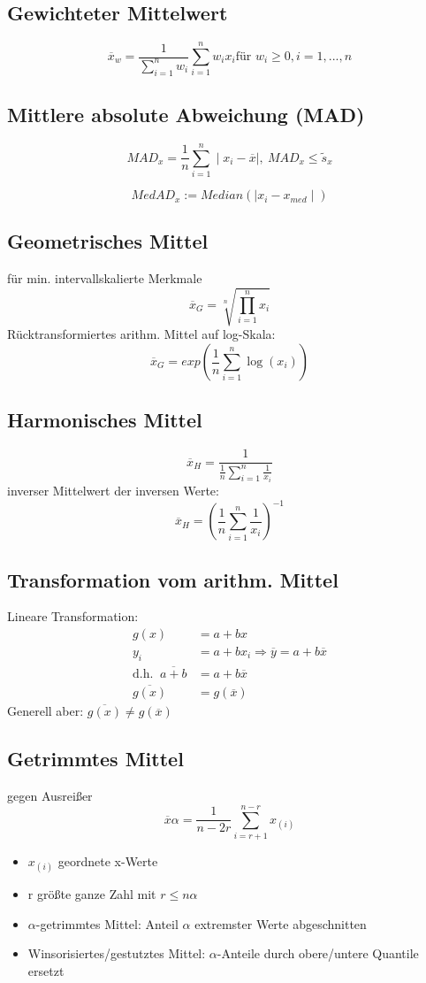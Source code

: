 \documentclass[10pt,a4paper,landscape]{article}
\begin{document}
\begin{multicols}{4}
\subsection{Gewichteter Mittelwert}
\[
\overline{x}_w=\frac{1}{\sum_{i=1}^nw_i}\sum_{i=1}^nw_ix_i \text{für } w_i \geqslant 0, i= 1,...,n
\]

\subsection{Mittlere absolute Abweichung (MAD)}
\[
MAD_x = \frac{1}{n}\sum_{i=1}^n \mid x_i - \overline{x}\mid, ~MAD_x \leq \tilde{s}_x
\]

\[
MedAD_x :=Median(\mid x_i - x_{med}\mid)
\]

\subsection{Geometrisches Mittel}
für min. intervallskalierte Merkmale
\[
\overline{x}_G = \sqrt[n]{\prod_{i=1}^nx_i}
\]
Rücktransformiertes arithm. Mittel auf log-Skala:
\[
\overline{x}_G=exp\left(\frac{1}{n}\sum_{i=1}^n\log(x_i)\right)
\]

\subsection{Harmonisches Mittel}
\[
\overline{x}_H =\frac{1}{\frac{1}{n}\sum_{i=1}^n\frac{1}{x_i}}
\]
inverser Mittelwert der inversen Werte:
\[
\overline{x}_H=\left(\frac{1}{n}\sum_{i=1}^n\frac{1}{x_i}\right)^{-1}
\]

\subsection{Transformation vom arithm. Mittel}
Lineare Transformation:
\begin{align*}
g(x) &= a+bx \\
y_i &= a+bx_i \Rightarrow \overline{y}=a+b\overline{x}\\
\text{d.h. }~ \overline{a+b} &= a+b\overline{x} \\
\overline{g(x)}&=g(\overline{x})
\end{align*}
Generell aber: $\overline{g(x)}\neq g(\overline{x})$

\subsection{Getrimmtes Mittel}
gegen Ausreißer
\[
\overline{x}\alpha = \frac{1}{n-2r}\sum_{i=r+1}^{n-r}x_{(i)}
\]
\begin{itemize}
\item $x_{(i)}$ geordnete x-Werte
\item r größte ganze Zahl mit $r\leqslant n\alpha$
\item $\alpha$-getrimmtes Mittel: Anteil $\alpha$ extremster Werte abgeschnitten
\item Winsorisiertes/gestutztes Mittel: $\alpha$-Anteile durch obere/untere Quantile ersetzt
\end{itemize}


\end{multicols}
\end{document}
